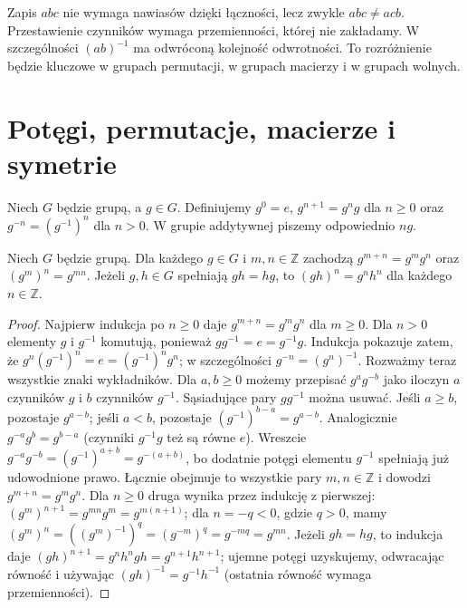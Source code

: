 \begin{uwaga}
Zapis $abc$ nie wymaga nawiasów dzięki łączności, lecz zwykle
$abc\ne acb$. Przestawienie czynników wymaga przemienności,
której nie zakładamy. W szczególności $(ab)^{-1}$ ma odwróconą
kolejność odwrotności. To rozróżnienie będzie kluczowe w grupach
permutacji, w grupach macierzy i w grupach wolnych.
\end{uwaga}

\section{Potęgi, permutacje, macierze i symetrie}
\begin{definicja}
Niech $G$ będzie grupą, a $g\in G$. Definiujemy $g^0=e$,
$g^{n+1}=g^ng$ dla $n\ge0$ oraz $g^{-n}=(g^{-1})^n$
dla $n>0$. W grupie addytywnej piszemy odpowiednio $ng$.
\end{definicja}

\begin{lemat}
\label{aa:lem:potegi}
Niech $G$ będzie grupą. Dla każdego $g\in G$ i $m,n\in\mathbb Z$ zachodzą
$g^{m+n}=g^mg^n$ oraz $(g^m)^n=g^{mn}$.
Jeżeli $g,h\in G$ spełniają $gh=hg$, to $(gh)^n=g^nh^n$
dla każdego $n\in\mathbb Z$.
\end{lemat}
\begin{proof}
Najpierw indukcja po $n\ge0$ daje $g^{m+n}=g^mg^n$
dla $m\ge0$. Dla $n>0$ elementy $g$ i $g^{-1}$ komutują, ponieważ
$gg^{-1}=e=g^{-1}g$. Indukcja pokazuje zatem, że
$g^n(g^{-1})^n=e=(g^{-1})^ng^n$; w szczególności
$g^{-n}=(g^n)^{-1}$.
Rozważmy teraz wszystkie znaki wykładników. Dla $a,b\ge0$
możemy przepisać $g^ag^{-b}$ jako iloczyn $a$ czynników
$g$ i $b$ czynników $g^{-1}$. Sąsiadujące pary $gg^{-1}$
można usuwać. Jeśli $a\ge b$, pozostaje $g^{a-b}$;
jeśli $a<b$, pozostaje $(g^{-1})^{b-a}=g^{a-b}$.
Analogicznie $g^{-a}g^b=g^{b-a}$ (czynniki $g^{-1}g$
też są równe $e$). Wreszcie
$g^{-a}g^{-b}=(g^{-1})^{a+b}=g^{-(a+b)}$,
bo dodatnie potęgi elementu $g^{-1}$ spełniają już
udowodnione prawo. Łącznie obejmuje to wszystkie pary
$m,n\in\mathbb Z$ i dowodzi $g^{m+n}=g^mg^n$. Dla $n\ge0$
druga wynika przez indukcję z pierwszej:
$(g^m)^{n+1}=g^{mn}g^m=g^{m(n+1)}$;
dla $n=-q<0$, gdzie $q>0$, mamy
$(g^m)^n=((g^m)^{-1})^q=(g^{-m})^q=g^{-mq}=g^{mn}$.
Jeżeli $gh=hg$, to indukcja daje
$(gh)^{n+1}=g^nh^ngh=g^{n+1}h^{n+1}$;
ujemne potęgi uzyskujemy, odwracając równość i używając
$(gh)^{-1}=g^{-1}h^{-1}$ (ostatnia równość wymaga przemienności).
\end{proof}


